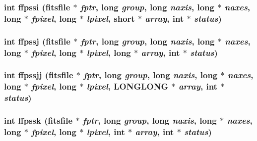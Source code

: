 \subsubsection{\setlength{\rightskip}{0pt plus 5cm}int ffpssi (\bf{fitsfile} $\ast$ {\em fptr}, long {\em group}, long {\em naxis}, long $\ast$ {\em naxes}, long $\ast$ {\em fpixel}, long $\ast$ {\em lpixel}, short $\ast$ {\em array}, int $\ast$ {\em status})}\label{fitsio__64_8h_2cf8bd9e8aec6e36d824b4fd9b34b9e0}


\subsubsection{\setlength{\rightskip}{0pt plus 5cm}int ffpssj (\bf{fitsfile} $\ast$ {\em fptr}, long {\em group}, long {\em naxis}, long $\ast$ {\em naxes}, long $\ast$ {\em fpixel}, long $\ast$ {\em lpixel}, long $\ast$ {\em array}, int $\ast$ {\em status})}\label{fitsio__64_8h_ed68d2a2c51c19b9579ca7db53e148c5}


\subsubsection{\setlength{\rightskip}{0pt plus 5cm}int ffpssjj (\bf{fitsfile} $\ast$ {\em fptr}, long {\em group}, long {\em naxis}, long $\ast$ {\em naxes}, long $\ast$ {\em fpixel}, long $\ast$ {\em lpixel}, \bf{LONGLONG} $\ast$ {\em array}, int $\ast$ {\em status})}\label{fitsio__64_8h_f77af8b17c852fc01b279669bc4d1331}


\subsubsection{\setlength{\rightskip}{0pt plus 5cm}int ffpssk (\bf{fitsfile} $\ast$ {\em fptr}, long {\em group}, long {\em naxis}, long $\ast$ {\em naxes}, long $\ast$ {\em fpixel}, long $\ast$ {\em lpixel}, int $\ast$ {\em array}, int $\ast$ {\em status})}\label{fitsio__64_8h_07580d14729935ae3509602b651e7449}


